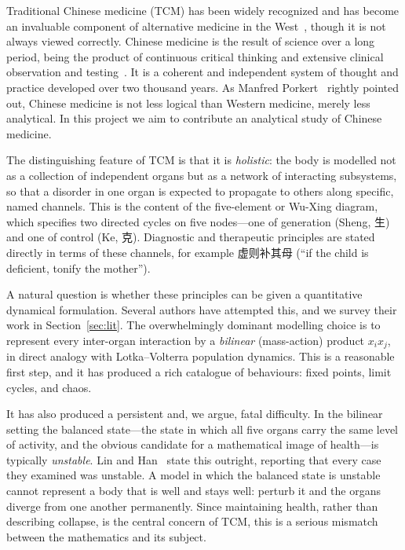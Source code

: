 \documentclass[11pt]{article}
\begin{document}
Traditional Chinese medicine (TCM) has been widely recognized and has become an
invaluable component of alternative medicine in the West~\cite{Kaptchuk2000},
though it is not always viewed correctly. Chinese medicine is the result of
science over a long period, being the product of continuous critical thinking
and extensive clinical observation and testing~\cite{Kaptchuk2000}. It is a
coherent and independent system of thought and practice developed over two
thousand years. As Manfred Porkert~\cite{Porkert1990} rightly pointed out,
Chinese medicine is not less logical than Western medicine, merely less
analytical. In this project we aim to contribute an analytical study of Chinese
medicine.

The distinguishing feature of TCM is that it is \emph{holistic}: the body is
modelled not as a collection of independent organs but as a network of
interacting subsystems, so that a disorder in one organ is expected to
propagate to others along specific, named channels. This is the content of the
five-element or Wu-Xing diagram, which specifies two directed cycles on five
nodes---one of generation (Sheng, 生) and one of control (Ke, 克). Diagnostic
and therapeutic principles are stated directly in terms of these channels, for
example 虚则补其母 (``if the child is deficient, tonify the mother'').

A natural question is whether these principles can be given a quantitative
dynamical formulation. Several authors have attempted this, and we survey their
work in Section~\ref{sec:lit}. The overwhelmingly dominant modelling choice is
to represent every inter-organ interaction by a \emph{bilinear} (mass-action)
product $x_ix_j$, in direct analogy with Lotka--Volterra population dynamics.
This is a reasonable first step, and it has produced a rich catalogue of
behaviours: fixed points, limit cycles, and chaos.

It has also produced a persistent and, we argue, fatal difficulty. In the
bilinear setting the balanced state---the state in which all five organs carry
the same level of activity, and the obvious candidate for a mathematical image
of health---is typically \emph{unstable}. Lin and Han~\cite{Lin2020} state this
outright, reporting that every case they examined was unstable. A model in which
the balanced state is unstable cannot represent a body that is well and stays
well: perturb it and the organs diverge from one another permanently. Since
maintaining health, rather than describing collapse, is the central concern of
TCM, this is a serious mismatch between the mathematics and its subject.
\end{document}
